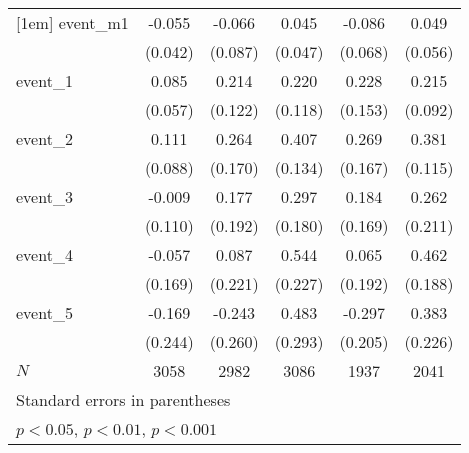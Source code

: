 {\begin{tabular}{l*{5}{c}}
[1em]
event\_m1    &      -0.055         &      -0.066         &       0.045         &      -0.086         &       0.049         \\
            &     (0.042)         &     (0.087)         &     (0.047)         &     (0.068)         &     (0.056)         \\
[1em]
event\_1     &       0.085         &       0.214         &       0.220         &       0.228         &       0.215\sym{*}  \\
            &     (0.057)         &     (0.122)         &     (0.118)         &     (0.153)         &     (0.092)         \\
[1em]
event\_2     &       0.111         &       0.264         &       0.407\sym{**} &       0.269         &       0.381\sym{***}\\
            &     (0.088)         &     (0.170)         &     (0.134)         &     (0.167)         &     (0.115)         \\
[1em]
event\_3     &      -0.009         &       0.177         &       0.297         &       0.184         &       0.262         \\
            &     (0.110)         &     (0.192)         &     (0.180)         &     (0.169)         &     (0.211)         \\
[1em]
event\_4     &      -0.057         &       0.087         &       0.544\sym{*}  &       0.065         &       0.462\sym{*}  \\
            &     (0.169)         &     (0.221)         &     (0.227)         &     (0.192)         &     (0.188)         \\
[1em]
event\_5     &      -0.169         &      -0.243         &       0.483         &      -0.297         &       0.383         \\
            &     (0.244)         &     (0.260)         &     (0.293)         &     (0.205)         &     (0.226)         \\
\hline
\(N\)       &        3058         &        2982         &        3086         &        1937         &        2041         \\
\hline\hline
\multicolumn{6}{l}{\footnotesize Standard errors in parentheses}\\
\multicolumn{6}{l}{\footnotesize \sym{*} \(p<0.05\), \sym{**} \(p<0.01\), \sym{***} \(p<0.001\)}\\
\end{tabular}
}
